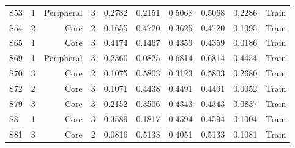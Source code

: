 {\begin{longtable}{lrrrrrrrrr}
  S53 & 1 & Peripheral & 3 & 0.2782 & 0.2151 & 0.5068 & 0.5068 & 0.2286 & Train \\
  S54 & 2 & Core & 2 & 0.1655 & 0.4720 & 0.3625 & 0.4720 & 0.1095 & Train \\
  S65 & 1 & Core & 3 & 0.4174 & 0.1467 & 0.4359 & 0.4359 & 0.0186 & Train \\
  S69 & 1 & Peripheral & 3 & 0.2360 & 0.0825 & 0.6814 & 0.6814 & 0.4454 & Train \\
  S70 & 3 & Core & 2 & 0.1075 & 0.5803 & 0.3123 & 0.5803 & 0.2680 & Train \\
  S72 & 2 & Core & 3 & 0.1071 & 0.4438 & 0.4491 & 0.4491 & 0.0052 & Train \\
  S79 & 3 & Core & 3 & 0.2152 & 0.3506 & 0.4343 & 0.4343 & 0.0837 & Train \\
  S8 & 1 & Core & 3 & 0.3589 & 0.1817 & 0.4594 & 0.4594 & 0.1004 & Train \\
  S81 & 3 & Core & 2 & 0.0816 & 0.5133 & 0.4051 & 0.5133 & 0.1081 & Train \\
\end{longtable}
}
